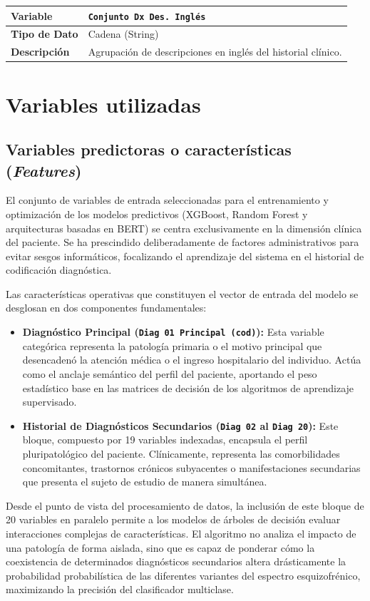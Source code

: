\documentclass[12pt,a4paper,onecolumn,oneside]{report}
\begin{document}
\noindent
\begin{tabular}{|p{3.5cm}|p{10.5cm}|}
\hline
\rowcolor[RGB]{239,239,239} 
\textbf{Variable} & \textbf{\texttt{Conjunto Dx Des. Inglés}} \\ \hline
\textbf{Tipo de Dato} & Cadena (String) \\ \hline
\textbf{Descripción} & Agrupación de descripciones en inglés del historial clínico. \\ \hline
\end{tabular}
\label{tab:var_conjunto_dx_des_ing}
\vspace{0.4cm}

\section{Variables utilizadas}
\subsection{Variables predictoras o características (\textit{Features})}

El conjunto de variables de entrada seleccionadas para el entrenamiento y optimización de los modelos predictivos (XGBoost, Random Forest y arquitecturas basadas en BERT) se centra exclusivamente en la dimensión clínica del paciente. Se ha prescindido deliberadamente de factores administrativos para evitar sesgos informáticos, focalizando el aprendizaje del sistema en el historial de codificación diagnóstica.

Las características operativas que constituyen el vector de entrada del modelo se desglosan en dos componentes fundamentales:

\begin{itemize}
    \item \textbf{Diagnóstico Principal (\texttt{Diag 01 Principal (cod)}):} Esta variable categórica representa la patología primaria o el motivo principal que desencadenó la atención médica o el ingreso hospitalario del individuo. Actúa como el anclaje semántico del perfil del paciente, aportando el peso estadístico base en las matrices de decisión de los algoritmos de aprendizaje supervisado.
    
    \item \textbf{Historial de Diagnósticos Secundarios (\texttt{Diag 02} al \texttt{Diag 20}):} Este bloque, compuesto por 19 variables indexadas, encapsula el perfil pluripatológico del paciente. Clínicamente, representa las comorbilidades concomitantes, trastornos crónicos subyacentes o manifestaciones secundarias que presenta el sujeto de estudio de manera simultánea. 
\end{itemize}
Desde el punto de vista del procesamiento de datos, la inclusión de este bloque de 20 variables en paralelo permite a los modelos de árboles de decisión evaluar interacciones complejas de características. El algoritmo no analiza el impacto de una patología de forma aislada, sino que es capaz de ponderar cómo la coexistencia de determinados diagnósticos secundarios altera drásticamente la probabilidad probabilística de las diferentes variantes del espectro esquizofrénico, maximizando la precisión del clasificador multiclase.
\end{document}
